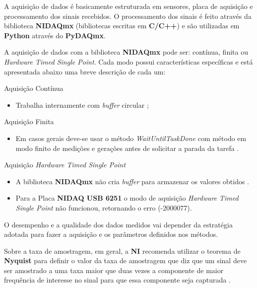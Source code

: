 \documentclass{ufscThesis}
\begin{document}
A aquisição de dados é basicamente estruturada em sensores, placa de aquisição e processamento dos sinais recebidos. O processamento dos sinais é feito através da biblioteca \textbf{NIDAQmx} (bibliotecas escritas em \textbf{C/C++}) e são utilizadas em \textbf{Python} através do \textbf{PyDAQmx}.

A aquisição de dados com a biblioteca \textbf{NIDAQmx} pode ser: contínua, finita ou \textit{Hardware Timed Single Point}. Cada modo possui características específicas e está apresentada abaixo uma breve descrição de cada um:

\begin{description}
  \item Aquisição Contínua
    \begin{itemize}
      \item Trabalha internamente com \textit{buffer} circular \cite{nidaqmx-faq};
    \end{itemize}
  \item Aquisição Finita
    \begin{itemize}
      \item Em casos gerais deve-se usar o método \textit{WaitUntilTaskDone} com método em modo finito de medições e gerações antes de solicitar a parada da tarefa \cite{nidaqmx-using-wait-until-done}.
    \end{itemize}
  \item Aquisição \textit{Hardware Timed Single Point}
    \begin{itemize}
      \item A biblioteca \textbf{NIDAQmx} não cria \textit{buffer} para armazenar os valores obtidos \cite{nidaqmx-hwtspsamplemode}.
      \item Para a Placa \textbf{NIDAQ USB 6251} o modo de aquisição \textit{Hardware Timed Single Point} não funcionou, retornando o erro (-2000077).
    \end{itemize}
\end{description} 

O desempenho e a qualidade dos dados medidos vai depender da estratégia adotada para fazer a aquisição e os parâmetros definidos nos métodos.

Sobre a taxa de amostragem, em geral, a \textbf{NI} recomenda utilizar o teorema de \textbf{Nyquist} para definir o valor da taxa de amostragem que diz que um sinal deve ser amostrado a uma taxa maior que duas vezes a componente de maior frequência de interesse no sinal para que essa componente seja capturada \cite{nidaqmx-conceitos-basicos-amostragem-analogica}.
\end{document}
